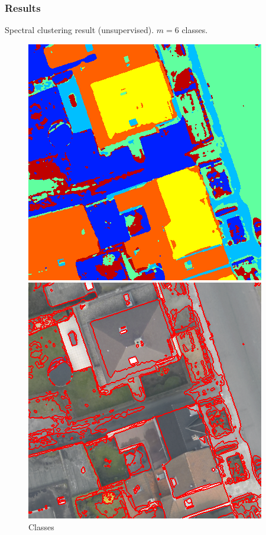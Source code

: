 \documentclass{beamer}
\begin{document}

\begin{frame}
  \frametitle{Results}
  Spectral clustering result (unsupervised). $m = 6$ classes.
  \begin{figure}[ht]
    \begin{minipage}[b]{0.45\linewidth}
      \centering
      \includegraphics[width=\textwidth]{./Images/DFC2015/K.png}
      \caption{Classes}
    \end{minipage}
    \begin{minipage}[b]{0.45\linewidth}
      \centering
      \includegraphics[width=\textwidth]{./Images/DFC2015/segmentation.png}

\end{minipage}
\end{figure}
\end{frame}
\end{document}
